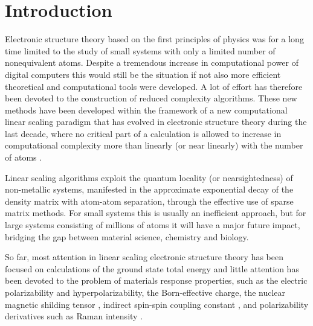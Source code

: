 \documentclass[prl,aps,twocolumn,showpacs,twocolumngrid,superbib]{revtex4}
\begin{document}

\section{Introduction}
 Electronic structure theory based on the first principles 
 of physics was for a long time limited to the study of small
 systems with only a limited number of nonequivalent atoms. 
 Despite a tremendous increase in computational power
 of digital computers this would still be the situation
 if not also more efficient theoretical and computational
 tools were developed. A lot of effort has therefore been
 devoted to the construction of reduced complexity algorithms.
 These new methods have been developed within the framework of
 a new computational linear scaling paradigm that has evolved in 
 electronic structure theory during the last decade, where
 no critical part of a calculation is allowed to increase in 
 computational complexity more than linearly (or near linearly) with the number
 of atoms \cite{GGalli96,DBowler97,SGoedecker99,POrdejon00,VGogonea01,SWu02}. 

 Linear scaling algorithms exploit the quantum locality 
 (or nearsightedness) of non-metallic systems, 
 manifested in the approximate exponential decay of the density matrix 
 with atom-atom separation, through the effective use of sparse 
 matrix methods. For small systems this is usually an inefficient
 approach, but for large systems consisting of millions
 of atoms it will have a major future impact, bridging the gap
 between material science, chemistry and biology. 

 So far, most attention in linear scaling electronic structure theory 
 has been focused on calculations of the ground state total energy and 
 little attention has been devoted to the problem of materials response properties, 
 such as the electric polarizability and hyperpolarizability, the Born-effective charge,
 the nuclear magnetic shilding tensor \cite{Pulay_1990}, indirect spin-spin coupling
 constant \cite{Pennington_1991,Malkin_1996}, and polarizability derivatives such as 
 Raman intensity \cite{Lazzeri_2003,Champagne_2001}.
\end{document}

